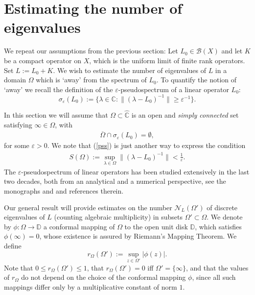 \documentclass[12pt,a4paper]{article}
\theoremstyle{definition}
\theoremstyle{remark}
\numberwithin{equation}{section}
\newcommand{\mc}{{\mathbb C}}
\newcommand{\md}{{\mathbb D}}
\renewcommand{\epsilon}{\varepsilon}
\newcommand{\eps}{\epsilon}
\newcommand{\bdd}{\mathcal{B}}
\begin{document}
\section{Estimating the number of eigenvalues}

We repeat our assumptions from the previous section: Let $L_0 \in \bdd(X)$ and let $K$ be a compact operator on $X$, which is the uniform limit of finite rank operators. Set $L:=L_0+K$. We wish to estimate the number of eigenvalues of $L$ in a domain $\Omega$ which is `away' from the spectrum of $L_0$. To quantify the notion of `away' we 
recall the definition of the $\epsilon$-pseudospectrum of a linear operator $L_0$: 
\begin{equation}
\sigma_{\eps}(L_0) := \{ \lambda \in \mc : \|(\lambda-L_0)^{-1}\| \geq \eps^{-1}\}. 
\end{equation}

In this section we will assume that
$\Omega \subset \hat\mc$ is an open and \emph{simply connected} set satisfying $\infty \in \Omega$, with 
\begin{align}\label{pss}
\overline{\Omega}\cap \sigma_\eps(L_0)=\emptyset,
\end{align}
for some $\epsilon>0$.
We note that (\ref{pss}) is just another way to express the condition
\begin{align}
S(\Omega):=\sup_{\lambda\in \Omega}\|(\lambda-L_0)^{-1}\|< \frac{1}{\epsilon}. \label{fin}
\end{align}
The $\eps$-pseudospectrum of linear operators has been studied extensively in the last two decades, both from an analytical and a numerical perspective, see the monographs \cite{MR2155029} and \cite{b_Davies} and references therein. 

 Our general result will provide estimates on the number $\mathcal{N}_L(\Omega')$ of discrete eigenvalues of $L$ (counting algebraic multiplicity) 
 in subsets $\Omega' \subset \Omega$.
We denote by $ \phi :\Omega \to \md $ a conformal mapping of $\Omega$ to the open unit disk $\md$, which satisfies $\phi(\infty)=0$, whose existence is assured by Riemann's Mapping Theorem. We define 
$$r_{\Omega}(\Omega'):=\sup_{z\in \Omega'}|\phi(z)|.$$ 
Note that $0 \leq r_{\Omega}(\Omega')\leq 1$, that $r_\Omega(\Omega')=0$ iff $\Omega'=\{\infty\}$, and that the values of  $r_\Omega$ do not depend on the choice of the conformal mapping $\phi$, since all such mappings differ only by a multiplicative constant of norm $1$. 
\end{document}
